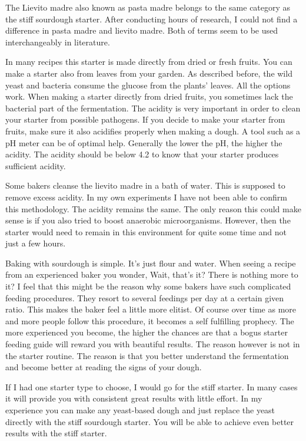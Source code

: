The Lievito madre also known as pasta madre belongs to the same category as
the stiff sourdough starter. After conducting hours of research, I could not
find a difference in pasta madre and lievito madre. Both of terms seem to be
used interchangeably in literature.

In many recipes this starter is made directly
from dried or fresh fruits. You can make a starter also from leaves from your
garden. As described before, the wild yeast and bacteria consume the glucose
from the plants' leaves. All the options work. When making a starter directly
from dried fruits, you sometimes lack the bacterial part of the fermentation.
The acidity is very important in order to clean your starter from possible
pathogens. If you decide to make your starter from fruits, make sure it also
acidifies properly when making a dough. A tool such as a pH meter can be of
optimal help. Generally the lower the pH, the higher the acidity. The acidity
should be below 4.2 to know that your starter produces sufficient acidity.

Some bakers cleanse the lievito madre in a bath of water. This is supposed to
remove excess acidity. In my own experiments I have not been able to confirm
this methodology. The acidity remains the same. The only reason this could
make sense is if you also tried to boost anaerobic microorganisms. However, then the
starter would need to remain in this environment for quite some time and not just
a few hours.

Baking with sourdough is simple. It's just flour and water. When seeing a recipe
from an experienced baker you wonder, Wait, that's it? There is nothing more
to it? I feel that this might be the reason why some bakers have such complicated
feeding procedures. They resort to several feedings per day at a certain given ratio.
This makes the baker feel a little more elitist. Of course over time as
more and more people follow this procedure, it becomes a self fulfilling prophecy.
The more experienced you become, the higher the chances are that a bogus starter
feeding guide will reward you with beautiful results. The reason however is
not in the starter routine. The reason is that you better understand the fermentation
and become better at reading the signs of your dough.

If I had one starter type to choose, I would go for the stiff starter. In many cases
it will provide you with consistent great results with little effort.
In my experience you can make any yeast-based dough and just replace
the yeast directly with the stiff sourdough starter. You will be able
to achieve even better results with the stiff starter.

